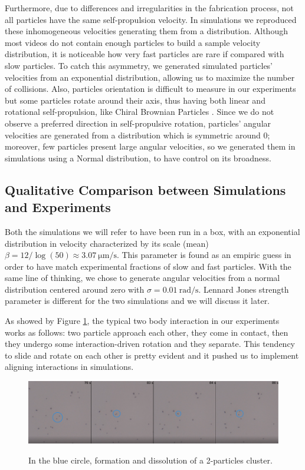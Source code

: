 \documentclass[../../master_thesis_np.tex]{subfiles}
\begin{document}
	Furthermore, due to differences and irregularities in the fabrication process, not all particles have the same self-propulsion velocity.
	In simulations we reproduced these inhomogeneous velocities generating them from a distribution.
	Although most videos do not contain enough particles to build a sample velocity distribution, it is noticeable how very fast particles are rare if compared with slow particles.
	To catch this asymmetry, we generated simulated particles' velocities from an exponential distribution, allowing us to maximize the number of collisions.
	Also, particles orientation is difficult to measure in our experiments but some particles rotate around their axis, thus having both linear and rotational self-propulsion, like  Chiral Brownian Particles \cite{callegari_numerical_2019, bechinger_active_2016}.
	Since we do not observe a preferred direction in self-propulsive rotation, particles' angular velocities are generated from a distribution which is symmetric around 0; moreover, few particles present large angular velocities, so we generated them in simulations using a Normal distribution, to have control on its broadness.
	
	\subsection{Qualitative Comparison between Simulations and Experiments}	
	
	Both the simulations we will refer to have been run in a  box, with an exponential distribution in velocity characterized by its scale (mean) $\beta = 12/\log(50) \approx \SI{3.07}{\um \per \second}$.
	This parameter is found as an empiric guess in order to have match experimental fractions of slow and fast particles.
	With the same line of thinking, we chose to generate angular velocities from a normal distribution centered around zero with $\sigma = \SI{0.01}{\radian\per\second}$.
	Lennard Jones strength parameter is different for the two simulations and we will discuss it later.
	
	As showed by Figure \ref{fig:doub9}, the typical two body interaction in our experiments works as follows: two particle approach each other, they come in contact, then they undergo some interaction-driven rotation and they separate.
	This tendency to slide and rotate on each other is pretty evident and it pushed us to implement aligning interactions in simulations.
	\begin{figure}[hbtp]
		\centering
		\includegraphics[width = \textwidth]{qual/doub9.png}
		\label{fig:doub9}
		\caption{In the blue circle, formation and dissolution of a 2-particles cluster.}
	\end{figure}
	
\end{document}
